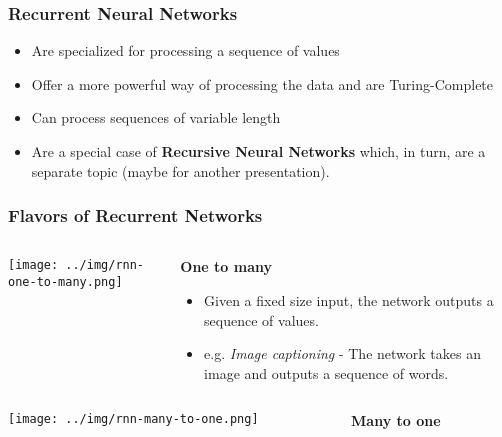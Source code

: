\documentclass{beamer}
\begin{document}
\begin{frame}
  \frametitle{Recurrent Neural Networks}
  \begin{itemize}
    \item Are specialized for processing a sequence of values \cite{goodfellow-et-al-2016}
    \item Offer a more powerful way of processing the data \cite{rnn-lecture} and are Turing-Complete \cite{siegelmann1995}
    \item Can process sequences of variable length \cite{goodfellow-et-al-2016}
    \item Are a special case of \textbf{Recursive Neural Networks} which, in turn, are a separate topic (maybe for another presentation).
  \end{itemize}
\end{frame}
\begin{frame}[allowframebreaks]
  \frametitle{Flavors of Recurrent Networks \cite{rnn-efectiveness}}
  \begin{columns}
    \begin{column}{0.3\textwidth}
      \begin{center}
        \texttt{[image: ../img/rnn-one-to-many.png]}
      \end{center}
    \end{column}
    \begin{column}{0.7\textwidth}
      \begin{center}
        \textbf{One to many}
      \end{center}
      \begin{itemize}
        \item Given a fixed size input, the network outputs a sequence of values.
        \item e.g. \textit{Image captioning} - The network takes an image and outputs a sequence of words.
      \end{itemize}
    \end{column}
  \end{columns}
  \framebreak
  \begin{columns}
    \begin{column}{0.3\textwidth}
      \texttt{[image: ../img/rnn-many-to-one.png]}
    \end{column}
    \begin{column}{0.7\textwidth}
      \begin{center}
        \textbf{Many to one}
      \end{center}

\end{column}
\end{columns}
\end{frame}
\end{document}
